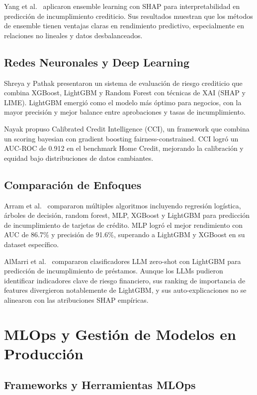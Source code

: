Yang et al.~\cite{yang2025interpretable} aplicaron ensemble learning con SHAP para interpretabilidad en predicción de incumplimiento crediticio. Sus resultados muestran que los métodos de ensemble tienen ventajas claras en rendimiento predictivo, especialmente en relaciones no lineales y datos desbalanceados.

\subsection{Redes Neuronales y Deep Learning}

Shreya y Pathak \cite{shreya2025explainable} presentaron un sistema de evaluación de riesgo crediticio que combina XGBoost, LightGBM y Random Forest con técnicas de XAI (SHAP y LIME). LightGBM emergió como el modelo más óptimo para negocios, con la mayor precisión y mejor balance entre aprobaciones y tasas de incumplimiento.

Nayak \cite{nayak2026calibrated} propuso Calibrated Credit Intelligence (CCI), un framework que combina un scoring bayesian con gradient boosting fairness-constrained. CCI logró un AUC-ROC de 0.912 en el benchmark Home Credit, mejorando la calibración y equidad bajo distribuciones de datos cambiantes.

\subsection{Comparación de Enfoques}

Arram et al.~\cite{arram2023credit} compararon múltiples algoritmos incluyendo regresión logística, árboles de decisión, random forest, MLP, XGBoost y LightGBM para predicción de incumplimiento de tarjetas de crédito. MLP logró el mejor rendimiento con AUC de 86.7\% y precisión de 91.6\%, superando a LightGBM y XGBoost en su dataset específico.

AlMarri et al.~\cite{almarri2025interpreting} compararon clasificadores LLM zero-shot con LightGBM para predicción de incumplimiento de préstamos. Aunque los LLMs pudieron identificar indicadores clave de riesgo financiero, sus ranking de importancia de features divergieron notablemente de LightGBM, y sus auto-explicaciones no se alinearon con las atribuciones SHAP empíricas.

\section{MLOps y Gestión de Modelos en Producción}
\subsection{Frameworks y Herramientas MLOps}


